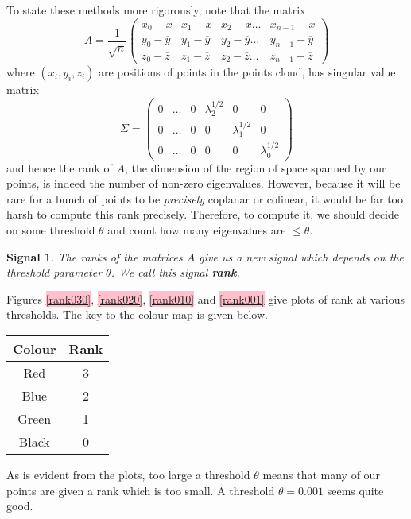 \documentclass[a4paper,11pt,twoside]{article}
\newtheorem*{signals}{Signal}
\theoremstyle{definition}
\theoremstyle{remark}
\newcommand{\sh}[1]{\colorbox{pink}{#1}}
\newcommand{\lnk}[1]{\sh{\hyperref[#1]{\ref*{#1}}}}
\newenvironment{sigs}
   {\colorlet{shadecolor}{green!50}\begin{shaded}\begin{signals}}
   {\end{signals}\end{shaded}}
\begin{document}
To state these methods more rigorously, note that the matrix 
\begin{displaymath}
A=\frac{1}{\sqrt{n}}
\begin{pmatrix}
x_0-\overline x& x_1-\overline x&x_2-\overline x\dots & x_{n-1}-\overline x\\
y_0-\overline y& y_1-\overline y&y_2-\overline y\dots & y_{n-1}-\overline y\\
z_0-\overline z& z_1-\overline z&z_2-\overline z\dots & z_{n-1}-\overline z
\end{pmatrix}
\end{displaymath}
where $(x_i,y_i,z_i)$ are positions of points in the points cloud, has singular value matrix 
\begin{displaymath}
\Sigma=\begin{pmatrix}
0&\dots&0&\lambda_2^{1/2}& 0&0 \\
0&\dots&0&0& \lambda_1^{1/2}&0 \\
0&\dots&0&0& 0&\lambda_0^{1/2} 
\end{pmatrix}
\end{displaymath}
and hence the rank of $A$, the dimension of the region of space spanned by our points, is indeed the number of non-zero eigenvalues. However, because it will be rare for a bunch of points to be \emph{precisely} coplanar or colinear, it would be far too harsh to compute this rank precisely. Therefore, to compute it, we should decide on some threshold $\theta$ and count how many eigenvalues are $\leqslant \theta$. 
\begin{sigs}The ranks of the matrices $A$ give us a new signal which depends on the threshold parameter $\theta$. We call this signal \textbf{rank}.
\end{sigs}
Figures \lnk{rank030}, \lnk{rank020}, \lnk{rank010} and \lnk{rank001} give plots of rank at various thresholds. The key to the colour map is given below.
\begin{center}
\begin{tabular}{c|c}
Colour & Rank\\
\hline
Red & 3\\
Blue & 2\\
Green & 1\\
Black & 0\\
\end{tabular}
\end{center}
As is evident from the plots, too large a threshold $\theta$ means that many of our points are given a rank which is too small. A threshold $\theta =0.001$ seems quite good. 
\end{document}
